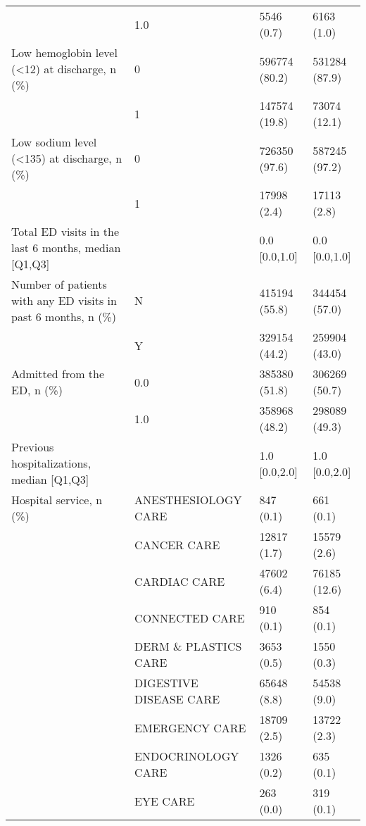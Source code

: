 \begin{tabular}{llll}
                                       & 1.0 &         5546 (0.7) &         6163 (1.0) \\
Low hemoglobin level (<12) at discharge, n (\%) & 0 &      596774 (80.2) &      531284 (87.9) \\
                                       & 1 &      147574 (19.8) &       73074 (12.1) \\
Low sodium level (<135) at discharge, n (\%) & 0 &      726350 (97.6) &      587245 (97.2) \\
                                       & 1 &        17998 (2.4) &        17113 (2.8) \\
Total ED visits in the last 6 months, median [Q1,Q3] &   &      0.0 [0.0,1.0] &      0.0 [0.0,1.0] \\
Number of patients with any ED visits in past 6 months, n (\%) & N &      415194 (55.8) &      344454 (57.0) \\
                                       & Y &      329154 (44.2) &      259904 (43.0) \\
Admitted from the ED, n (\%) & 0.0 &      385380 (51.8) &      306269 (50.7) \\
                                       & 1.0 &      358968 (48.2) &      298089 (49.3) \\
Previous hospitalizations, median [Q1,Q3] &   &      1.0 [0.0,2.0] &      1.0 [0.0,2.0] \\
Hospital service, n (\%) & ANESTHESIOLOGY CARE &          847 (0.1) &          661 (0.1) \\
                                       & CANCER CARE &        12817 (1.7) &        15579 (2.6) \\
                                       & CARDIAC CARE &        47602 (6.4) &       76185 (12.6) \\
                                       & CONNECTED CARE &          910 (0.1) &          854 (0.1) \\
                                       & DERM \& PLASTICS CARE &         3653 (0.5) &         1550 (0.3) \\
                                       & DIGESTIVE DISEASE CARE &        65648 (8.8) &        54538 (9.0) \\
                                       & EMERGENCY CARE &        18709 (2.5) &        13722 (2.3) \\
                                       & ENDOCRINOLOGY CARE &         1326 (0.2) &          635 (0.1) \\
                                       & EYE CARE &          263 (0.0) &          319 (0.1) \\

\end{tabular}
